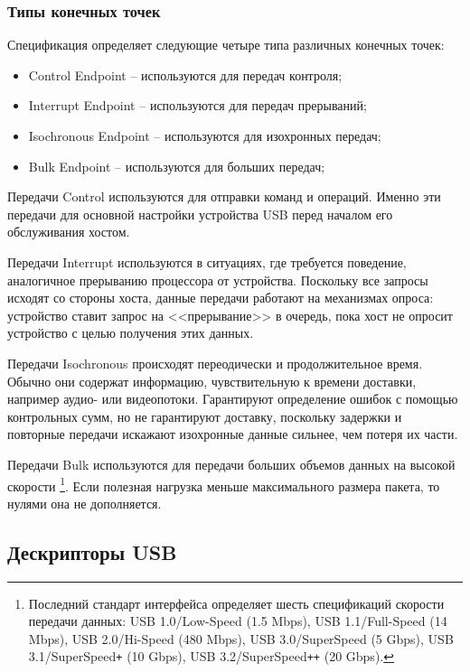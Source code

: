 \subsubsection{Типы конечных точек}

Спецификация определяет следующие четыре типа различных конечных точек:
\begin{itemize}
    \item Control Endpoint -- используются для передач контроля;
    \item Interrupt Endpoint -- используются для передач прерываний;
    \item Isochronous Endpoint -- используются для изохронных передач;
    \item Bulk Endpoint -- используются для больших передач;
\end{itemize}

Передачи Control используются для отправки команд и операций. 
Именно эти передачи для основной настройки устройства USB 
перед началом его обслуживания хостом.

Передачи Interrupt используются в ситуациях, где требуется поведение,
аналогичное прерыванию процессора от устройства.
Поскольку все запросы исходят со стороны хоста, данные передачи
работают на механизмах опроса: устройство ставит запрос на <<прерывание>>
в очередь, пока хост не опросит устройство с целью получения этих данных.

Передачи Isochronous происходят переодически и продолжительное время. 
Обычно они содержат информацию, чувствительную к времени доставки, 
например аудио- или видеопотоки. 
Гарантируют определение ошибок с помощью контрольных сумм, 
но не гарантируют доставку, 
поскольку задержки и повторные передачи искажают изохронные данные
сильнее, чем потеря их части.

Передачи Bulk используются для передачи больших объемов данных на высокой скорости
\footnote{%
    Последний стандарт интерфейса определяет шесть спецификаций скорости передачи данных:
    USB 1.0/Low-Speed (1.5 Mbps), 
    USB 1.1/Full-Speed (14 Mbps),
    USB 2.0/Hi-Speed (480 Mbps), 
    USB 3.0/SuperSpeed (5 Gbps),
    USB 3.1/SuperSpeed\texttt{+} (10 Gbps),
    USB 3.2/SuperSpeed\texttt{++} (20 Gbps).
}.
Если полезная нагрузка меньше максимального размера пакета, то нулями она не дополняется.

\subsection{Дескрипторы USB}

